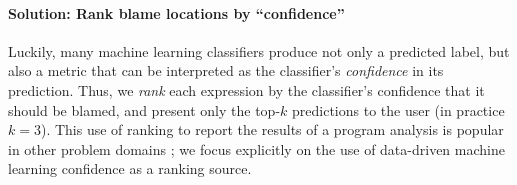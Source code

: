 \paragraph{\textbf{Solution: Rank blame locations by ``confidence''}}
Luckily, many machine learning classifiers produce not only a predicted
label, but also a metric that can be interpreted as the classifier's
\emph{confidence} in its prediction.
%
Thus, we \emph{rank} each expression by the classifier's confidence that
it should be blamed, and present only the top-$k$ predictions to the
user (in practice $k=3$). This use of ranking to report
the results of a program analysis is popular in other problem domains
\citep[\eg via statistics][]{Kremenek2003-ck}; we focus
explicitly on the use of data-driven machine learning confidence as a
ranking source.



